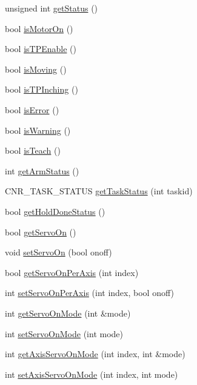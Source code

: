 \begin{DoxyCompactItemize}
\item 
unsigned int \hyperlink{classCNRobo_a3ad21bf205c9eab96ec4d5eba3865688}{get\-Status} ()
\item 
bool \hyperlink{classCNRobo_abbf7ec51fc336d72f8bc375caea35767}{is\-Motor\-On} ()
\item 
bool \hyperlink{classCNRobo_aae4429f1427b731f8b0db8faadd89297}{is\-T\-P\-Enable} ()
\item 
bool \hyperlink{classCNRobo_a2d7d5754b39af0dd3c590d7cdc090a5f}{is\-Moving} ()
\item 
bool \hyperlink{classCNRobo_a434c3cff1a67e41be7c03f3f7ab14c75}{is\-T\-P\-Inching} ()
\item 
bool \hyperlink{classCNRobo_a34b918d0612b4bb690491eed171b2b0c}{is\-Error} ()
\item 
bool \hyperlink{classCNRobo_a04c27c94b835b5f25bfca340ff09fceb}{is\-Warning} ()
\item 
bool \hyperlink{classCNRobo_acee09703c5832a0c8062ccffa97203fe}{is\-Teach} ()
\item 
int \hyperlink{classCNRobo_a612a1a0e8970f0cfbb639946ded19f48}{get\-Arm\-Status} ()
\item 
C\-N\-R\-\_\-\-T\-A\-S\-K\-\_\-\-S\-T\-A\-T\-U\-S \hyperlink{classCNRobo_aa13060802cf704a70ebbfca4c789e284}{get\-Task\-Status} (int taskid)
\item 
bool \hyperlink{classCNRobo_a44ed4064b8423e9b51f428167cbc12a3}{get\-Hold\-Done\-Status} ()
\item 
bool \hyperlink{classCNRobo_aa3b762eb753c14d4b411832400da62b5}{get\-Servo\-On} ()
\item 
void \hyperlink{classCNRobo_aeea7ad8b6117139de50ccdfdf30b7938}{set\-Servo\-On} (bool onoff)
\item 
bool \hyperlink{classCNRobo_a540794f3a598d80257137a65d96d5ce8}{get\-Servo\-On\-Per\-Axis} (int index)
\item 
int \hyperlink{classCNRobo_a2da9b3a94833fa1bf008e561c2e1d690}{set\-Servo\-On\-Per\-Axis} (int index, bool onoff)
\item 
int \hyperlink{classCNRobo_a6df9042b5725124058e56b2706dda1b2}{get\-Servo\-On\-Mode} (int \&mode)
\item 
int \hyperlink{classCNRobo_aaed0fe111f49768299469964ccf2fb7f}{set\-Servo\-On\-Mode} (int mode)
\item 
int \hyperlink{classCNRobo_a47582449aed7f9e23884cdb54e0de4b2}{get\-Axis\-Servo\-On\-Mode} (int index, int \&mode)
\item 
int \hyperlink{classCNRobo_a4cebeac96d27714747961226da4ea2ce}{set\-Axis\-Servo\-On\-Mode} (int index, int mode)

\end{DoxyCompactItemize}
